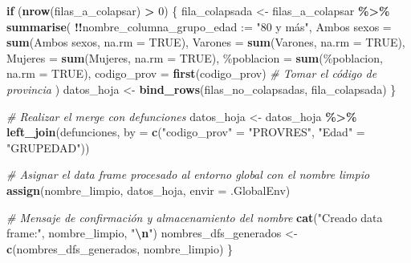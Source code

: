 \documentclass[
]{article}
\newenvironment{Shaded}{\begin{snugshade}}{\end{snugshade}}
\newcommand{\AttributeTok}[1]{\textcolor[rgb]{0.13,0.29,0.53}{#1}}
\newcommand{\CommentTok}[1]{\textcolor[rgb]{0.56,0.35,0.01}{\textit{#1}}}
\newcommand{\ConstantTok}[1]{\textcolor[rgb]{0.56,0.35,0.01}{#1}}
\newcommand{\ControlFlowTok}[1]{\textcolor[rgb]{0.13,0.29,0.53}{\textbf{#1}}}
\newcommand{\DecValTok}[1]{\textcolor[rgb]{0.00,0.00,0.81}{#1}}
\newcommand{\FunctionTok}[1]{\textcolor[rgb]{0.13,0.29,0.53}{\textbf{#1}}}
\newcommand{\NormalTok}[1]{#1}
\newcommand{\OtherTok}[1]{\textcolor[rgb]{0.56,0.35,0.01}{#1}}
\newcommand{\SpecialCharTok}[1]{\textcolor[rgb]{0.81,0.36,0.00}{\textbf{#1}}}
\newcommand{\StringTok}[1]{\textcolor[rgb]{0.31,0.60,0.02}{#1}}
\begin{document}
\begin{Shaded}
\begin{Highlighting}[]
  \ControlFlowTok{if}\NormalTok{ (}\FunctionTok{nrow}\NormalTok{(filas\_a\_colapsar) }\SpecialCharTok{\textgreater{}} \DecValTok{0}\NormalTok{) \{}
\NormalTok{    fila\_colapsada }\OtherTok{\textless{}{-}}\NormalTok{ filas\_a\_colapsar }\SpecialCharTok{\%\textgreater{}\%}
      \FunctionTok{summarise}\NormalTok{(}
        \SpecialCharTok{!!}\AttributeTok{nombre\_columna\_grupo\_edad :=} \StringTok{"80 y más"}\NormalTok{,}
        \StringTok{\textasciigrave{}}\AttributeTok{Ambos sexos}\StringTok{\textasciigrave{}} \OtherTok{=} \FunctionTok{sum}\NormalTok{(}\StringTok{\textasciigrave{}}\AttributeTok{Ambos sexos}\StringTok{\textasciigrave{}}\NormalTok{, }\AttributeTok{na.rm =} \ConstantTok{TRUE}\NormalTok{),}
        \StringTok{\textasciigrave{}}\AttributeTok{Varones}\StringTok{\textasciigrave{}} \OtherTok{=} \FunctionTok{sum}\NormalTok{(}\StringTok{\textasciigrave{}}\AttributeTok{Varones}\StringTok{\textasciigrave{}}\NormalTok{, }\AttributeTok{na.rm =} \ConstantTok{TRUE}\NormalTok{),}
        \StringTok{\textasciigrave{}}\AttributeTok{Mujeres}\StringTok{\textasciigrave{}} \OtherTok{=} \FunctionTok{sum}\NormalTok{(}\StringTok{\textasciigrave{}}\AttributeTok{Mujeres}\StringTok{\textasciigrave{}}\NormalTok{, }\AttributeTok{na.rm =} \ConstantTok{TRUE}\NormalTok{),}
        \StringTok{\textasciigrave{}}\AttributeTok{\%poblacion}\StringTok{\textasciigrave{}} \OtherTok{=} \FunctionTok{sum}\NormalTok{(}\StringTok{\textasciigrave{}}\AttributeTok{\%poblacion}\StringTok{\textasciigrave{}}\NormalTok{, }\AttributeTok{na.rm =} \ConstantTok{TRUE}\NormalTok{),}
        \AttributeTok{codigo\_prov =} \FunctionTok{first}\NormalTok{(codigo\_prov) }\CommentTok{\# Tomar el código de provincia}
\NormalTok{      )}
\NormalTok{    datos\_hoja }\OtherTok{\textless{}{-}} \FunctionTok{bind\_rows}\NormalTok{(filas\_no\_colapsadas, fila\_colapsada)}
\NormalTok{  \}}
  
  \CommentTok{\# Realizar el merge con \textquotesingle{}defunciones\textquotesingle{}}
\NormalTok{  datos\_hoja }\OtherTok{\textless{}{-}}\NormalTok{ datos\_hoja }\SpecialCharTok{\%\textgreater{}\%}
    \FunctionTok{left\_join}\NormalTok{(defunciones,}
              \AttributeTok{by =} \FunctionTok{c}\NormalTok{(}\StringTok{"codigo\_prov"} \OtherTok{=} \StringTok{"PROVRES"}\NormalTok{, }\StringTok{"Edad"} \OtherTok{=} \StringTok{"GRUPEDAD"}\NormalTok{))}
  
  \CommentTok{\# Asignar el data frame procesado al entorno global con el nombre limpio}
  \FunctionTok{assign}\NormalTok{(nombre\_limpio, datos\_hoja, }\AttributeTok{envir =}\NormalTok{ .GlobalEnv)}
  
  \CommentTok{\# Mensaje de confirmación y almacenamiento del nombre}
  \FunctionTok{cat}\NormalTok{(}\StringTok{"Creado data frame:"}\NormalTok{, nombre\_limpio, }\StringTok{"}\SpecialCharTok{\textbackslash{}n}\StringTok{"}\NormalTok{)}
\NormalTok{  nombres\_dfs\_generados }\OtherTok{\textless{}{-}} \FunctionTok{c}\NormalTok{(nombres\_dfs\_generados, nombre\_limpio)}
\NormalTok{\}}
\end{Highlighting}
\end{Shaded}
\end{document}
